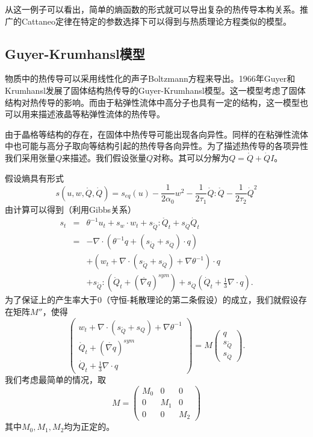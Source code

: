 \documentclass{article}
\begin{document}
从这一例子可以看出，简单的熵函数的形式就可以导出复杂的热传导本构关系。推广的Cattaneo定律在特定的参数选择下可以得到与热质理论方程类似的模型。

\subsection{Guyer-Krumhansl模型}
物质中的热传导可以采用线性化的声子Boltzmann方程来导出。1966年Guyer和Krumhansl发展了固体结构热传导的Guyer-Krumhansl模型\cite{guyer1966solution}。这一模型考虑了固体结构对热传导的影响。而由于粘弹性流体中高分子也具有一定的结构，这一模型也可以用来描述液晶等粘弹性流体的热传导\cite{}。

由于晶格等结构的存在，在固体中热传导可能出现各向异性。同样的在粘弹性流体中也可能与高分子取向等结构引起的热传导各向异性。为了描述热传导的各项异性我们采用张量$Q$来描述。我们假设张量${Q}$对称。其可以分解为${Q}=\mathring{{Q}}+\dot{Q}{I}$。

假设熵具有形式
\begin{equation*}
s(u,{w},\mathring{{Q}},\dot{Q})=s_{eq}(u)-\frac{1}{2 \alpha_0}{w}^2-\frac{1}{2\tau_1} {\mathring{{Q}}}:{\mathring{{Q}}}-\frac{1}{2\tau_2}\dot{Q}^2
\end{equation*}
由计算可以得到（利用Gibbs关系）
\begin{eqnarray*}
s_t &=& \theta^{-1} u_t +s_{w} \cdot {w}_t + s_{\mathring{{Q}}}:\mathring{{Q}}_t+s_{\dot{Q}} \dot{Q}_t \\
    &=& -\nabla \cdot (\theta^{-1} {q}+ (s_{\mathring{{Q}}}+s_{\dot{Q}}) \cdot {q})\\
    	&&+({w}_t+\nabla \cdot (s_{\mathring{{Q}}}+s_{\dot{Q}})+\nabla \theta^{-1}) \cdot {q} \\
&& +s_{\mathring{{Q}}}:(\mathring{{Q}}_t+(\mathring{\nabla {q}})^{sym})+s_{\dot{Q}}(\dot{Q}_t+\frac{1}{3}\nabla \cdot {q}).
\end{eqnarray*}
为了保证上的产生率大于0（守恒-耗散理论的第二条假设）的成立，我们就假设存在矩阵$M''$，使得
\begin{equation*}
\left( \begin{array}{ll} {w}_t+\nabla \cdot (s_{\mathring{{Q}}}+s_Q)+\nabla \theta^{-1} \\ \mathring{{Q}}_t+(\mathring{\nabla {q}})^{sym} \\ \dot{Q}_t+\frac{1}{3} \nabla \cdot {q} \end{array} \right) = M \left( \begin{array}{l} {q} \\ s_{\mathring{{Q}}} \\s_{\dot{Q}} \end{array} \right).
\end{equation*}
我们考虑最简单的情况，取
\begin{equation*}
	M=\left( \begin{array}{lll} M_0 & 0 & 0 \\0 & M_1 & 0 \\0 & 0 & M_2 \end{array} \right)
\end{equation*}
其中$M_0,M_1,M_2$均为正定的。
\end{document}
